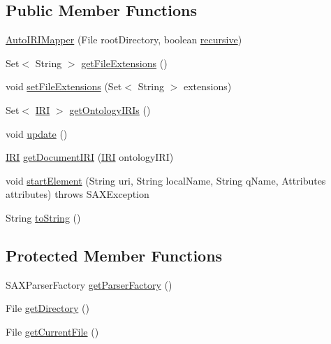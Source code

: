 \subsection*{Public Member Functions}
\begin{DoxyCompactItemize}
\item 
\hyperlink{classorg_1_1semanticweb_1_1owlapi_1_1util_1_1_auto_i_r_i_mapper_a2f7ca1f0baefb93d8f3ec91eca7c3cd1}{Auto\-I\-R\-I\-Mapper} (File root\-Directory, boolean \hyperlink{classorg_1_1semanticweb_1_1owlapi_1_1util_1_1_auto_i_r_i_mapper_a031ceaf910799a4c2be7be3b4f5e8cbe}{recursive})
\item 
Set$<$ String $>$ \hyperlink{classorg_1_1semanticweb_1_1owlapi_1_1util_1_1_auto_i_r_i_mapper_a98ac96dab909bd15f12f91bfd3f4e65e}{get\-File\-Extensions} ()
\item 
void \hyperlink{classorg_1_1semanticweb_1_1owlapi_1_1util_1_1_auto_i_r_i_mapper_afe71afdeeba6ef52aa6fd113f15f4269}{set\-File\-Extensions} (Set$<$ String $>$ extensions)
\item 
Set$<$ \hyperlink{classorg_1_1semanticweb_1_1owlapi_1_1model_1_1_i_r_i}{I\-R\-I} $>$ \hyperlink{classorg_1_1semanticweb_1_1owlapi_1_1util_1_1_auto_i_r_i_mapper_afe41ee939bb122929421cc30574ca23d}{get\-Ontology\-I\-R\-Is} ()
\item 
void \hyperlink{classorg_1_1semanticweb_1_1owlapi_1_1util_1_1_auto_i_r_i_mapper_ab06e17c7fc8c06805dfe0df50e107d0e}{update} ()
\item 
\hyperlink{classorg_1_1semanticweb_1_1owlapi_1_1model_1_1_i_r_i}{I\-R\-I} \hyperlink{classorg_1_1semanticweb_1_1owlapi_1_1util_1_1_auto_i_r_i_mapper_a94215eb1811491669a8e67b264a1764c}{get\-Document\-I\-R\-I} (\hyperlink{classorg_1_1semanticweb_1_1owlapi_1_1model_1_1_i_r_i}{I\-R\-I} ontology\-I\-R\-I)
\item 
void \hyperlink{classorg_1_1semanticweb_1_1owlapi_1_1util_1_1_auto_i_r_i_mapper_a70904d31ba2d24cbbf47a2513ab4073f}{start\-Element} (String uri, String local\-Name, String q\-Name, Attributes attributes)  throws S\-A\-X\-Exception 
\item 
String \hyperlink{classorg_1_1semanticweb_1_1owlapi_1_1util_1_1_auto_i_r_i_mapper_a2ea705ed085f20d52746c0a76d2bb8a3}{to\-String} ()
\end{DoxyCompactItemize}
\subsection*{Protected Member Functions}
\begin{DoxyCompactItemize}
\item 
S\-A\-X\-Parser\-Factory \hyperlink{classorg_1_1semanticweb_1_1owlapi_1_1util_1_1_auto_i_r_i_mapper_a3276cd2aa84f1c75ec68bf1d575e0cb8}{get\-Parser\-Factory} ()
\item 
File \hyperlink{classorg_1_1semanticweb_1_1owlapi_1_1util_1_1_auto_i_r_i_mapper_afa973dd34cf3d8f0328e0d743d5926fe}{get\-Directory} ()
\item 
File \hyperlink{classorg_1_1semanticweb_1_1owlapi_1_1util_1_1_auto_i_r_i_mapper_a359a5c216952e37573ec7dd8bb38e967}{get\-Current\-File} ()
\end{DoxyCompactItemize}
